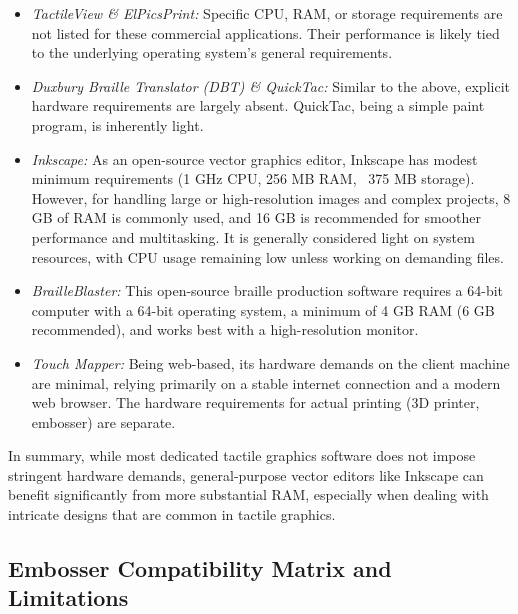 \begin{itemize}
    \item \emph{TactileView \& ElPicsPrint:} Specific CPU, RAM, or storage requirements are not listed for these commercial applications. \cite{DuxburyDBTDetails,IrieTactileView,BlindSVG,DuxburyNews} Their performance is likely tied to the underlying operating system's general requirements.
    \item \emph{Duxbury Braille Translator (DBT) \& QuickTac:} Similar to the above, explicit hardware requirements are largely absent. \cite{PerkinsTouchMapper,ViewplusTSS,IrieBrailleTrac,ElitaElPicsPrint,DuxburyProducts,ElitaManual} QuickTac, being a simple paint program, is inherently light. \cite{DuxburyDBTDetails}
    \item \emph{Inkscape:} As an open-source vector graphics editor, Inkscape has modest minimum requirements (1 GHz CPU, 256 MB RAM, ~375 MB storage). \cite{BlindHelpDBT} However, for handling large or high-resolution images and complex projects, 8 GB of RAM is commonly used, and 16 GB is recommended for smoother performance and multitasking. \cite{BlindHelpDBT} It is generally considered light on system resources, with CPU usage remaining low unless working on demanding files. \cite{BlindHelpDBT}
    \item \emph{BrailleBlaster:} This open-source braille production software requires a 64-bit computer with a 64-bit operating system, a minimum of 4 GB RAM (6 GB recommended), and works best with a high-resolution monitor. \cite{SterlingAdaptivesVP}
    \item \emph{Touch Mapper:} Being web-based, its hardware demands on the client machine are minimal, relying primarily on a stable internet connection and a modern web browser. \cite{AELData,NYUWorkflow,Ability2AccessTSS} The hardware requirements for actual printing (3D printer, embosser) are separate.
\end{itemize}

In summary, while most dedicated tactile graphics software does not impose stringent hardware demands, general-purpose vector editors like Inkscape can benefit significantly from more substantial RAM, especially when dealing with intricate designs that are common in tactile graphics.

\subsection{Embosser Compatibility Matrix and Limitations}

